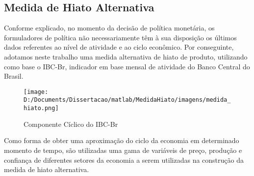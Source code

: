 \documentclass[
	article,			%
	11pt,				%
	oneside,			%
	a4paper,			%
	english,			%
	brazil,				%
	]{abntex2}
\begin{document}
\begin{appendices}
\chapter{Medida de Hiato Alternativa}

	Conforme explicado, no momento da decisão de política monetária, os formuladores de política não necessariamente têm à sua disposição os últimos dados referentes ao nível de atividade e ao ciclo econômico. Por conseguinte, adotamos neste trabalho uma medida alternativa de hiato de produto, utilizando como base o IBC-Br, indicador em base mensal de atividade do Banco Central do Brasil.
	
	\hfill \break
	\hfill \break
	\hfill \break
	\hfill \break
	\hfill \break
	\hfill \break
	\hfill \break
	\hfill \break
	
	\begin{figure}[!h]
	\texttt{[image: D:/Documents/Dissertacao/matlab/MedidaHiato/imagens/medida\_hiato.png]}
	\caption{Componente Cíclico do IBC-Br}
	\label{fig:ibc_br}
	\end{figure}
		
		
	Como forma de obter uma aproximação do ciclo da economia em determinado momento de tempo, são utilizadas uma gama de variáveis de preço, produção e confiança de diferentes setores da economia a serem utilizadas na construção da medida de hiato alternativa.
	

\end{appendices}
\end{document}
